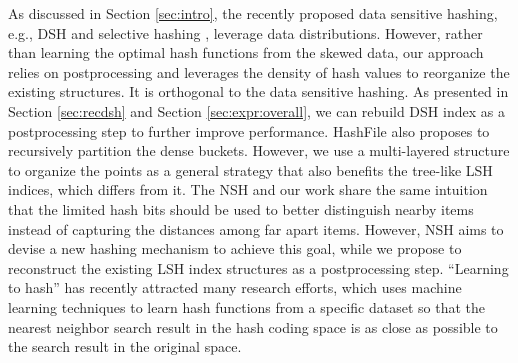  As discussed in Section \ref{sec:intro}, the recently proposed data sensitive hashing, e.g., DSH \cite{Gao:2014:DDS:2588555.2588565} and selective hashing \cite{Gao:2015:SHC:2783258.2783284}, leverage data distributions. However, rather than learning the optimal hash functions from the skewed data, our approach relies on postprocessing and leverages the density of hash values to reorganize the existing structures. It is orthogonal to the data sensitive hashing. As presented in Section \ref{sec:recdsh} and Section \ref{sec:expr:overall}, we can rebuild DSH index as a postprocessing step to further improve performance. HashFile \cite{Zhang:2011:HEI:2004686.2005629} also proposes to recursively partition the dense buckets. However, we use a multi-layered structure to organize the points as a general strategy that also benefits the tree-like LSH indices, which differs from it. The NSH \cite{Park:2015:NH:2850583.2850589} and our work share the same intuition that the limited hash bits should be used to better distinguish nearby items instead of capturing the distances among far apart items. However, NSH aims to devise a new hashing mechanism to achieve this goal, while we propose to reconstruct the existing LSH index structures as a postprocessing step. ``Learning to hash'' \cite{7915742} has recently attracted many research efforts, which uses machine learning techniques to learn hash functions from a specific dataset so that the nearest neighbor search result in the hash coding space is as close as possible to the search result in the original space.






